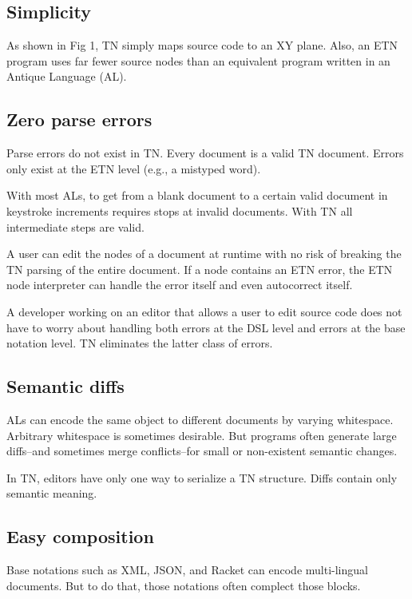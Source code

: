 \documentclass[journal]{IEEEtran}
\begin{document}
\subsection{Simplicity}

As shown in Fig 1, TN simply maps source code to an XY plane. Also, an ETN program uses far fewer source nodes than an equivalent program written in an Antique Language (AL).

\subsection{Zero parse errors}

Parse errors do not exist in TN. Every document is a valid TN document. Errors only exist at the ETN level (e.g., a mistyped word).

With most ALs, to get from a blank document to a certain valid document in keystroke increments requires stops at invalid documents. With TN all intermediate steps are valid.

A user can edit the nodes of a document at runtime with no risk of breaking the TN parsing of the entire document. If a node contains an ETN error, the ETN node interpreter can handle the error itself and even autocorrect itself.

A developer working on an editor that allows a user to edit source code does not have to worry about handling both errors at the DSL level and errors at the base notation level. TN eliminates the latter class of errors.

\subsection{Semantic diffs}

ALs can encode the same object to different documents by varying whitespace. Arbitrary whitespace is sometimes desirable. But programs often generate large diffs--and sometimes merge conflicts--for small or non-existent semantic changes.

In TN, editors have only one way to serialize a TN structure. Diffs contain only semantic meaning.

\subsection{Easy composition}

Base notations such as XML\cite{Bray}, JSON\cite{Crockford}, and Racket\cite{Racket} can encode multi-lingual documents. But to do that, those notations often complect those blocks.
\end{document}
